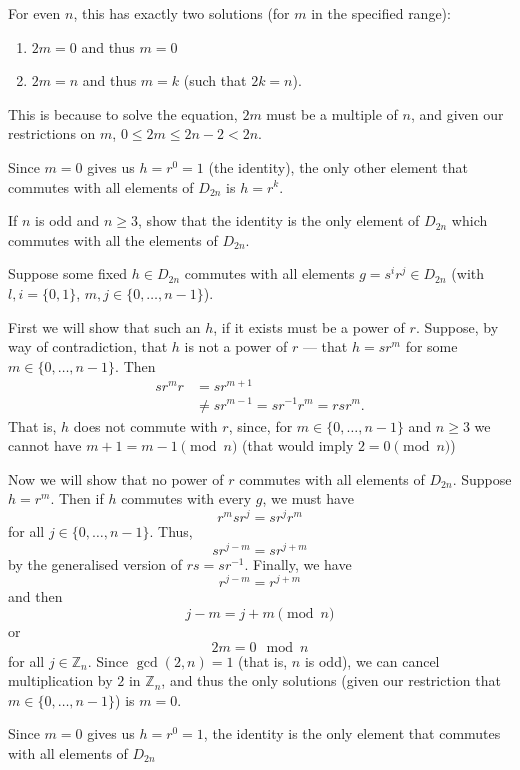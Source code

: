 \documentclass[12 pt, letterpaper]{hmcpset}
\begin{document}
\begin{solution}
	For even $n$, this has exactly two solutions (for $m$ in the specified range):
	\begin{enumerate}[label = (\roman*)]
		\item $2m = 0$ and thus $m = 0$
		\item $2m = n$ and thus $m = k$ (such that $2k = n$).
	\end{enumerate}
	This is because to solve the equation, $2m$ must be a multiple of $n$, and given our restrictions on $m$, $0 \le 2m \le 2n - 2 < 2n$. 

	Since $m = 0$ gives us $h = r^0 = 1$ (the identity), the only other element that commutes with all elements of $D_{2n}$ is $h = r^k$.
\end{solution}

\pagebreak

\begin{problem}
	If $n$ is odd and $n \ge 3$, show that the identity is the only element of $D_{2n}$ which commutes with all the elements of $D_{2n}$.
\end{problem}

\begin{solution}
	Suppose some fixed $h \in D_{2n}$ commutes with all elements $g = s^i r^j \in D_{2n}$ (with $l, i = \{ 0, 1 \}$, $m, j \in \{ 0, \ldots, n - 1 \}$). 

	First we will show that such an $h$, if it exists must be a power of $r$. Suppose, by way of contradiction, that $h$ is not a power of $r$ --- that $h = s r^m$ for some $m \in \{ 0, \ldots, n - 1 \}$. Then
	\[
		\begin{split}
			s r^m r & = s r^{m + 1} \\
				& \neq s r^{m - 1} = s r^{-1} r^m = r s r^m.
		\end{split}
	\]
	That is, $h$ does not commute with $r$, since, for $m \in \{ 0, \ldots, n - 1 \}$ and $n \ge 3$ we cannot have $m + 1 = m - 1 \pmod n$ (that would imply $2 = 0 \pmod n$) 

	Now we will show that no power of $r$ commutes with all elements of $D_{2n}$. Suppose $h = r^m$. Then if $h$ commutes with every $g$, we must have
	\[
		r^m s r^j = s r^j r^m
	\]
	for all $j \in \{ 0, \ldots, n - 1 \}$. Thus,
	\[
		s r^{j - m} = s r^{j + m}
	\]
	by the generalised version of $r s = s r^{-1}$. Finally, we have
	\[
		r^{j - m} = r^{j + m}
	\]
	and then
	\[
		j - m = j + m \pmod n
	\]
	or
	\[
		2m = 0 \mod n
	\]
	for all $j \in \mathbb Z_n$. Since $\gcd(2, n) = 1$ (that is, $n$ is odd), we can cancel multiplication by $2$ in $\mathbb Z_n$, and thus the only solutions (given our restriction that $m \in \{ 0, \ldots, n - 1 \}$) is $m = 0$. 

	Since $m = 0$ gives us $h = r^0 = 1$, the identity is the only element that commutes with all elements of $D_{2n}$
\end{solution}
\end{document}
